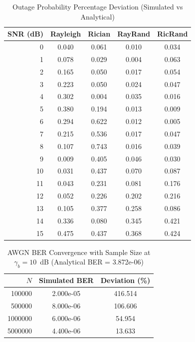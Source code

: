 \begin{table}[htbp]
\centering
\caption{Outage Probability Percentage Deviation (Simulated vs Analytical)}
\label{tab:outage_dev}
\begin{tabular}{rcccc}
\toprule
SNR (dB) & Rayleigh & Rician & RayRand & RicRand \\
\midrule
0 & 0.040 & 0.061 & 0.010 & 0.034 \\
1 & 0.078 & 0.029 & 0.004 & 0.063 \\
2 & 0.165 & 0.050 & 0.017 & 0.054 \\
3 & 0.223 & 0.050 & 0.024 & 0.047 \\
4 & 0.302 & 0.004 & 0.035 & 0.016 \\
5 & 0.380 & 0.194 & 0.013 & 0.009 \\
6 & 0.294 & 0.622 & 0.012 & 0.005 \\
7 & 0.215 & 0.536 & 0.017 & 0.047 \\
8 & 0.107 & 0.743 & 0.016 & 0.039 \\
9 & 0.009 & 0.405 & 0.046 & 0.030 \\
10 & 0.031 & 0.437 & 0.070 & 0.087 \\
11 & 0.043 & 0.231 & 0.081 & 0.176 \\
12 & 0.052 & 0.226 & 0.202 & 0.216 \\
13 & 0.105 & 0.377 & 0.258 & 0.086 \\
14 & 0.336 & 0.080 & 0.345 & 0.421 \\
15 & 0.475 & 0.437 & 0.368 & 0.424 \\
\bottomrule
\end{tabular}
\end{table}

\begin{table}[htbp]
\centering
\caption{AWGN BER Convergence with Sample Size at $\gamma_b=10$~dB (Analytical BER = 3.872e-06)}
\label{tab:sample_conv}
\begin{tabular}{rcc}
\toprule
$N$ & Simulated BER & Deviation (\%) \\
\midrule
100000 & 2.000e-05 & 416.514 \\
500000 & 8.000e-06 & 106.606 \\
1000000 & 6.000e-06 & 54.954 \\
5000000 & 4.400e-06 & 13.633 \\
\bottomrule
\end{tabular}
\end{table}
